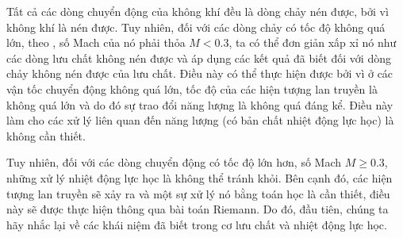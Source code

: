 Tất cả các dòng chuyển động của không khí đều là dòng chảy nén được, bởi vì không khí là nén được. Tuy nhiên, đối với các dòng chảy có tốc độ không quá lớn, theo , số Mach của nó phải thỏa $M <0.3$, ta có thể đơn giản xấp xỉ nó như các dòng lưu chất không nén được và áp dụng các kết quả đã biết đối với dòng chảy không nén được của lưu chất. Điều này có thể thực hiện được bởi vì ở các vận tốc chuyển động không quá lớn, tốc độ của các hiện tượng lan truyền là không quá lớn và do đó sự trao đổi năng lượng là không quá đáng kể. Điều này làm cho các xử lý liên quan đến năng lượng (có bản chất nhiệt động lực học) là không cần thiết.

Tuy nhiên, đối với các dòng chuyển động có tốc độ lớn hơn, số Mach $M\ge 0.3$, những xử lý nhiệt động lực học là không thể tránh khỏi. Bên cạnh đó, các hiện tượng lan truyền sẽ xảy ra và một sự xử lý nó bằng toán học là cần thiết, điều này sẽ được thực hiện thông qua bài toán Riemann. Do đó, đầu tiên, chúng ta hãy nhắc lại về các khái niệm đã biết trong cơ lưu chất và nhiệt động lực học.